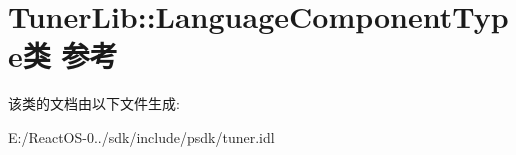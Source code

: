 \hypertarget{class_tuner_lib_1_1_language_component_type}{}\section{Tuner\+Lib\+:\+:Language\+Component\+Type类 参考}
\label{class_tuner_lib_1_1_language_component_type}


该类的文档由以下文件生成\+:\begin{DoxyCompactItemize}
\item 
E\+:/\+React\+O\+S-\/0../sdk/include/psdk/tuner.\+idl\end{DoxyCompactItemize}
